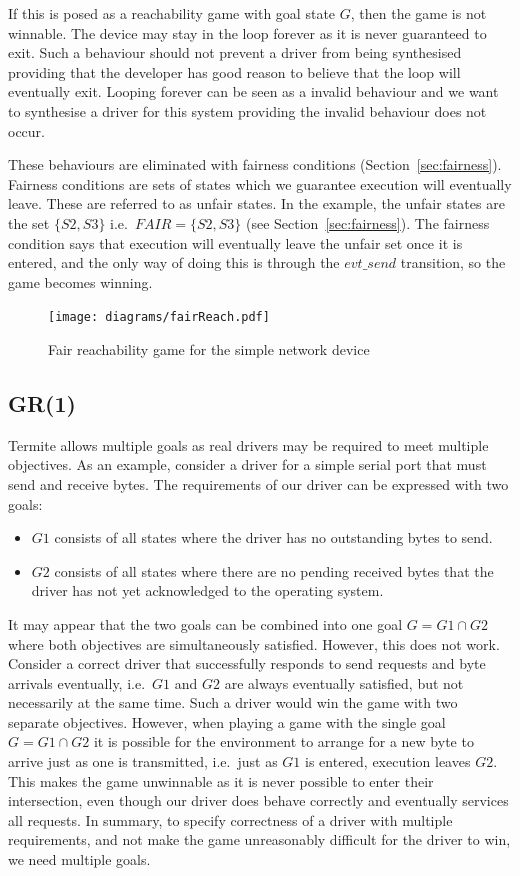 If this is posed as a reachability game with goal state $G$, then the game is not winnable. The device may stay in the loop forever as it is never guaranteed to exit. Such a behaviour should not prevent a driver from being synthesised providing that the developer has good reason to believe that the loop will eventually exit. Looping forever can be seen as a invalid behaviour and we want to synthesise a driver for this system providing the invalid behaviour does not occur. 

These behaviours are eliminated with fairness conditions (Section~\ref{sec:fairness}). Fairness conditions are sets of states which we guarantee execution will eventually leave. These are referred to as unfair states. In the example, the unfair states are the set $\{S2, S3\}$ i.e.\ $FAIR=\{S2, S3\}$ (see Section~\ref{sec:fairness}). The fairness condition says that execution will eventually leave the unfair set once it is entered, and the only way of doing this is through the $evt\_send$ transition, so the game becomes winning.

\begin{figure}[t]
\centering
\texttt{[image: diagrams/fairReach.pdf]}
\caption{Fair reachability game for the simple network device}
\label{fig:fair}
\end{figure}

\subsection{GR(1)}

Termite allows multiple goals as real drivers may be required to meet multiple objectives. As an example, consider a driver for a simple serial port that must send and receive bytes. The requirements of our driver can be expressed with two goals: 

\begin{itemize}
    \item $G1$ consists of all states where the driver has no outstanding bytes to send.
    \item $G2$ consists of all states where there are no pending received bytes that the driver has not yet acknowledged to the operating system. 
\end{itemize}

It may appear that the two goals can be combined into one goal $G = G1 \cap G2$ where both objectives are simultaneously satisfied. However, this does not work. Consider a correct driver that successfully responds to send requests and byte arrivals eventually, i.e.\ $G1$ and $G2$ are always eventually satisfied, but not necessarily at the same time. Such a driver would win the game with two separate objectives. However, when playing a game with the single goal $G = G1 \cap G2$ it is possible for the environment to arrange for a new byte to arrive just as one is transmitted, i.e.\ just as $G1$ is entered, execution leaves $G2$. This makes the game unwinnable as it is never possible to enter their intersection, even though our driver does behave correctly and eventually services all requests. In summary, to specify correctness of a driver with multiple requirements, and not make the game unreasonably difficult for the driver to win, we need multiple goals. 


